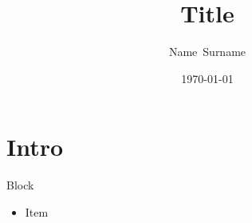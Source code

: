 \documentclass[12pt]{beamer}
\begin{document}
\def \transp{50}
\beamertemplatenavigationsymbolsempty
\title[]{Title}
\author{Name~Surname}
\date[\today]{\today}

\begin{frame}[plain]
  \titlepage
\end{frame}

\begin{frame}[plain]
  \tableofcontents
\end{frame}

\section{Intro}

\begin{frame}
\begin{block}{Block}
\begin{itemize}
	\item Item
\end{itemize}
\end{block}
\end{frame}
\end{document}
